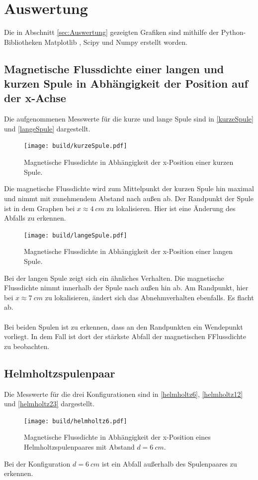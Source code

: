 \section{Auswertung}
\label{sec:Auswertung}
Die in Abschnitt \autoref{sec:Auswertung} gezeigten Grafiken sind mithilfe der Python-Bibliotheken Matplotlib \cite{matplotlib}, Scipy \cite{scipy} und Numpy \cite{numpy}
erstellt worden.
\subsection{Magnetische Flussdichte einer langen und kurzen Spule in Abhängigkeit der Position auf der x-Achse}

Die aufgenommenen Messwerte für die kurze und lange Spule sind in \autoref{kurzeSpule} und \autoref{langeSpule} dargestellt.
\begin{figure}[H]
    \texttt{[image: build/kurzeSpule.pdf]}
    \caption{Magnetische Flussdichte in Abhängigkeit der x-Position einer kurzen Spule.}
    \label{kurzeSpule}
\end{figure}
Die magnetische Flussdichte wird zum Mittelpunkt der kurzen Spule hin maximal und nimmt mit zunehmendem Abstand nach außen ab. 
Der Randpunkt der Spule ist in dem Graphen bei $x \approx \SI{4}{cm}$ zu lokalisieren. Hier ist eine Änderung des Abfalls zu erkennen.

\begin{figure}[H]
    \texttt{[image: build/langeSpule.pdf]}
    \caption{Magnetische Flussdichte in Abhängigkeit der x-Position einer langen Spule.}
    \label{langeSpule}
\end{figure}
Bei der langen Spule zeigt sich ein ähnliches Verhalten. Die magnetische Flussdichte nimmt innerhalb der Spule nach außen hin ab. Am Randpunkt, hier bei 
$x \approx \SI{7}{cm}$ zu lokalisieren, ändert sich das Abnehmverhalten ebenfalls. Es flacht ab.
\\
\\
Bei beiden Spulen ist zu erkennen, dass an den Randpunkten ein Wendepunkt vorliegt. In dem Fall ist dort der stärkste Abfall der magnetischen
FFlussdichte zu beobachten.
\newpage
\subsection{Helmholtzspulenpaar}
Die Messwerte für die drei Konfigurationen sind in \autoref{helmholtz6}, \autoref{helmholtz12} und \autoref{helmholtz23} dargestellt.

\begin{figure}[H]
    \texttt{[image: build/helmholtz6.pdf]}
    \caption{Magnetische Flussdichte in Abhängigkeit der x-Position eines Helmholtzspulenpaares mit Abstand $d =\SI{6}{cm}$.}
    \label{helmholtz6}
\end{figure}
Bei der Konfiguration $d = \SI{6}{cm}$ ist ein Abfall außerhalb des Spulenpaares zu erkennen.

